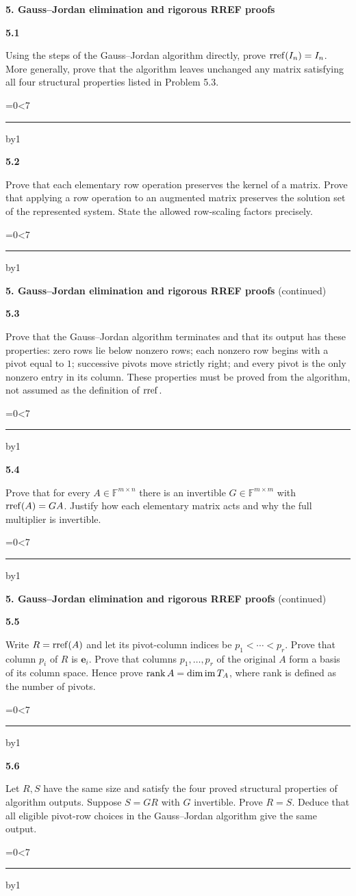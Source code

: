 \documentclass[11pt,letterpaper]{article}
\newcommand{\topicshort}{Problem collection}
\newcommand{\F}{\mathbb F}\newcommand{\R}{\mathbb R}\newcommand{\Q}{\mathbb Q}\newcommand{\C}{\mathbb C}\newcommand{\Z}{\mathbb Z}
\newcommand{\ruled}[1]{\par\begingroup\parskip=0pt\baselineskip=17pt\count255=0\loop\ifnum\count255<#1\noindent\textcolor{black!17}{\rule{\linewidth}{.25pt}}\par\advance\count255 by1\repeat\endgroup}
\newcommand{\problem}[4]{\noindent\begin{minipage}[t][3.48in][t]{\linewidth}\textbf{\color{navy}#1}\quad{\small\sffamily\color{teal}#2#3}\par #4\par\vfill\ruled{7}\end{minipage}}
\begin{document}
\newpage
\renewcommand{\topicshort}{Row reduction}
{\large\bfseries\color{navy}5. Gauss--Jordan elimination and rigorous RREF proofs}\par\vspace{9pt}
\problem{5.1}{W}{}{Using the steps of the Gauss--Jordan algorithm directly, prove $\operatorname{rref}(I_n)=I_n$. More generally, prove that the algorithm leaves unchanged any matrix satisfying all four structural properties listed in Problem 5.3.}
\par\vspace{14pt}
\problem{5.2}{W}{ / $\star$}{Prove that each elementary row operation preserves the kernel of a matrix. Prove that applying a row operation to an augmented matrix preserves the solution set of the represented system. State the allowed row-scaling factors precisely.}
\newpage
\renewcommand{\topicshort}{Row reduction}
{\large\bfseries\color{navy}5. Gauss--Jordan elimination and rigorous RREF proofs} {\small(continued)}\par\vspace{9pt}
\problem{5.3}{M}{ / $\star$}{Prove that the Gauss--Jordan algorithm terminates and that its output has these properties: zero rows lie below nonzero rows; each nonzero row begins with a pivot equal to $1$; successive pivots move strictly right; and every pivot is the only nonzero entry in its column. These properties must be proved from the algorithm, not assumed as the definition of $\operatorname{rref}$.}
\par\vspace{14pt}
\problem{5.4}{M}{ / $\star$}{Prove that for every $A\in\F^{m\times n}$ there is an invertible $G\in\F^{m\times m}$ with $\operatorname{rref}(A)=GA$. Justify how each elementary matrix acts and why the full multiplier is invertible.}
\newpage
\renewcommand{\topicshort}{Row reduction}
{\large\bfseries\color{navy}5. Gauss--Jordan elimination and rigorous RREF proofs} {\small(continued)}\par\vspace{9pt}
\problem{5.5}{M}{ / $\star$}{Write $R=\operatorname{rref}(A)$ and let its pivot-column indices be $p_1<\cdots<p_r$. Prove that column $p_i$ of $R$ is $\mathbf e_i$. Prove that columns $p_1,\ldots,p_r$ of the original $A$ form a basis of its column space. Hence prove $\operatorname{rank} A=\dim\operatorname{im}T_A$, where rank is defined as the number of pivots.}
\par\vspace{14pt}
\problem{5.6}{M}{ / $\star$}{Let $R,S$ have the same size and satisfy the four proved structural properties of algorithm outputs. Suppose $S=GR$ with $G$ invertible. Prove $R=S$. Deduce that all eligible pivot-row choices in the Gauss--Jordan algorithm give the same output.}
\end{document}

